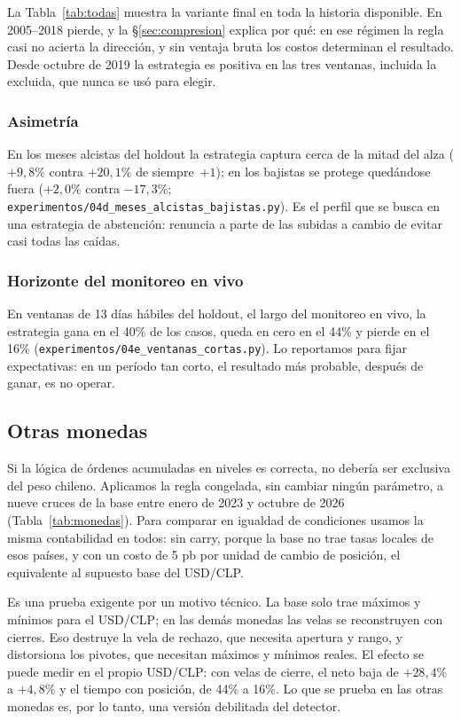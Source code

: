 \documentclass[10pt,a4paper]{article}
\newcommand{\ruta}[1]{\nolinkurl{#1}}
\begin{document}
La Tabla~\ref{tab:todas} muestra la variante final en toda la historia disponible. En
2005--2018 pierde, y la §\ref{sec:compresion} explica por qué: en ese régimen la regla
casi no acierta la dirección, y sin ventaja bruta los costos determinan el resultado.
Desde octubre de 2019 la estrategia es positiva en las tres ventanas, incluida la
excluida, que nunca se usó para elegir.

\subsubsection{Asimetría}

En los meses alcistas del holdout la estrategia captura cerca de la mitad del alza
($+9{,}8\%$ contra $+20{,}1\%$ de siempre~$+1$); en los bajistas se protege quedándose
fuera ($+2{,}0\%$ contra $-17{,}3\%$; \ruta{experimentos/04d_meses_alcistas_bajistas.py}).
Es el perfil que se busca en una estrategia de abstención: renuncia a parte de las
subidas a cambio de evitar casi todas las caídas.

\subsubsection{Horizonte del monitoreo en vivo}

En ventanas de 13 días hábiles del holdout, el largo del monitoreo en vivo, la estrategia
gana en el 40\% de los casos, queda en cero en el 44\% y pierde en el 16\%
(\ruta{experimentos/04e_ventanas_cortas.py}). Lo reportamos para fijar expectativas: en
un período tan corto, el resultado más probable, después de ganar, es no operar.

\subsection{Otras monedas}\label{sec:rob_monedas}

Si la lógica de órdenes acumuladas en niveles es correcta, no debería ser exclusiva del
peso chileno. Aplicamos la regla congelada, sin cambiar ningún parámetro, a nueve cruces
de la base entre enero de 2023 y octubre de 2026 (Tabla~\ref{tab:monedas}). Para
comparar en igualdad de condiciones usamos la misma contabilidad en todos: sin carry,
porque la base no trae tasas locales de esos países, y con un costo de 5 pb por unidad de
cambio de posición, el equivalente al supuesto base del USD/CLP.

Es una prueba exigente por un motivo técnico. La base solo trae máximos y mínimos para
el USD/CLP; en las demás monedas las velas se reconstruyen con cierres. Eso destruye la
vela de rechazo, que necesita apertura y rango, y distorsiona los pivotes, que necesitan
máximos y mínimos reales. El efecto se puede medir en el propio USD/CLP: con velas de
cierre, el neto baja de $+28{,}4\%$ a $+4{,}8\%$ y el tiempo con posición, de 44\% a
16\%. Lo que se prueba en las otras monedas es, por lo tanto, una versión debilitada del
detector.
\end{document}
